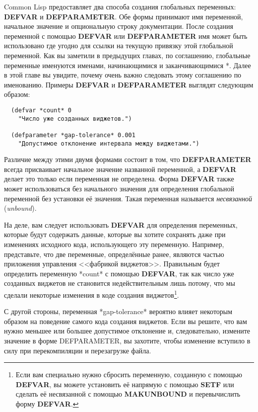 Common Lisp предоставляет два способа создания глобальных переменных: \textbf{DEFVAR} и
\textbf{DEFPARAMETER}. Обе формы принимают имя переменной, начальное значение и
опциональную строку документации. После создания переменной с помощью \textbf{DEFVAR} или
\textbf{DEFPARAMETER} имя может быть использовано где угодно для ссылки на текущую
привязку этой глобальной переменной. Как вы заметили в предыдущих главах, по соглашению,
глобальные переменные именуются именами, начинающимися и заканчивающимися *.  Далее в этой
главе вы увидите, почему очень важно следовать этому соглашению по именованию. Примеры
\textbf{DEFVAR} и \textbf{DEFPARAMETER} выглядят следующим образом:

\begin{lstlisting}
  (defvar *count* 0
    "Число уже созданных виджетов.")

  (defparameter *gap-tolerance* 0.001
    "Допустимое отклонение интервала между виджетами.")
\end{lstlisting}

Различие между этими двумя формами состоит в том, что \textbf{DEFPARAMETER} всегда
присваивает начальное значение названной переменной, а \textbf{DEFVAR} делает это только
если переменная не определена. Форма \textbf{DEFVAR} также может использоваться без
начального значения для определения глобальной переменной без установки её значения. Такая
переменная называется \textit{несвязанной} (\textit{unbound}).

На деле, вам следует использовать \textbf{DEFVAR} для определения переменных, которые
будут содержать данные, которые вы хотите сохранять даже при изменениях исходного кода,
использующего эту переменную. Например, представьте, что две переменные, определённые
ранее, являются частью приложения управления <<фабрикой виджетов>>. Правильным будет
определить переменную *count* с помощью \textbf{DEFVAR}, так как число уже созданных
виджетов не становится недействительным лишь потому, что мы сделали некоторые изменения в
коде создания виджетов\footnote{Если вам специально нужно сбросить переменную, созданную с
  помощью \textbf{DEFVAR}, вы можете установить её напрямую с помощью \textbf{SETF} или
  сделать её несвязанной с помощью \textbf{MAKUNBOUND} и перевычислить форму
  \textbf{DEFVAR}.}.

С другой стороны, переменная *gap-tolerance* вероятно влияет некоторым образом на
поведение самого кода создания виджетов. Если вы решите, что вам нужно меньшее или большее
допустимое отклонение и, следовательно, измените значение в форме DEFPARAMETER, вы
захотите, чтобы изменение вступило в силу при перекомпиляции и перезагрузке файла.

